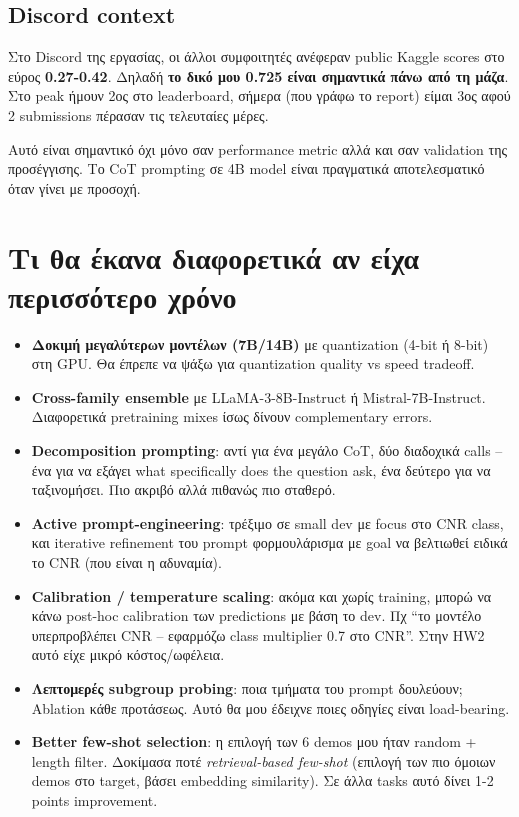 \documentclass[12pt]{fphw}
\begin{document}
\subsection{Discord context}

Στο Discord της εργασίας, οι άλλοι συμφοιτητές ανέφεραν public Kaggle scores στο εύρος \textbf{0.27-0.42}. Δηλαδή \textbf{το δικό μου 0.725 είναι σημαντικά πάνω από τη μάζα}. Στο peak ήμουν 2ος στο leaderboard, σήμερα (που γράφω το report) είμαι 3ος αφού 2 submissions πέρασαν τις τελευταίες μέρες.

Αυτό είναι σημαντικό όχι μόνο σαν performance metric αλλά και σαν validation της προσέγγισης. Το CoT prompting σε 4B model είναι πραγματικά αποτελεσματικό όταν γίνει με προσοχή.

\section{Τι θα έκανα διαφορετικά αν είχα περισσότερο χρόνο}

\begin{itemize}
    \item \textbf{Δοκιμή μεγαλύτερων μοντέλων (7B/14B)} με quantization (4-bit ή 8-bit) στη GPU. Θα έπρεπε να ψάξω για quantization quality vs speed tradeoff.
    \item \textbf{Cross-family ensemble} με LLaMA-3-8B-Instruct ή Mistral-7B-Instruct. Διαφορετικά pretraining mixes ίσως δίνουν complementary errors.
    \item \textbf{Decomposition prompting}: αντί για ένα μεγάλο CoT, δύο διαδοχικά calls -- ένα για να εξάγει what specifically does the question ask, ένα δεύτερο για να ταξινομήσει. Πιο ακριβό αλλά πιθανώς πιο σταθερό.
    \item \textbf{Active prompt-engineering}: τρέξιμο σε small dev με focus στο CNR class, και iterative refinement του prompt φορμουλάρισμα με goal να βελτιωθεί ειδικά το CNR (που είναι η αδυναμία).
    \item \textbf{Calibration / temperature scaling}: ακόμα και χωρίς training, μπορώ να κάνω post-hoc calibration των predictions με βάση το dev. Πχ ``το μοντέλο υπερπροβλέπει CNR -- εφαρμόζω class multiplier 0.7 στο CNR''. Στην HW2 αυτό είχε μικρό κόστος/ωφέλεια.
    \item \textbf{Λεπτομερές subgroup probing}: ποια τμήματα του prompt δουλεύουν; Ablation κάθε προτάσεως. Αυτό θα μου έδειχνε ποιες οδηγίες είναι load-bearing.
    \item \textbf{Better few-shot selection}: η επιλογή των 6 demos μου ήταν random + length filter. Δοκίμασα ποτέ \emph{retrieval-based few-shot} (επιλογή των πιο όμοιων demos στο target, βάσει embedding similarity). Σε άλλα tasks αυτό δίνει 1-2 points improvement.
\end{itemize}
\end{document}
